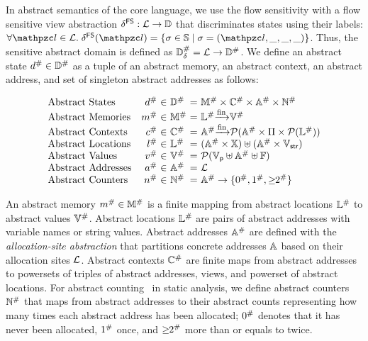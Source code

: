 In abstract semantics of the core language, we use the flow sensitivity with a
flow sensitive view abstraction $\delta^{\textsf{FS}}: \mathcal{L} \rightarrow \mathbb{D}$ that
discriminates states using their labels: $\forall \lab \in \labset. \;
\fsviewmap(\lab) = \{ \st \in \stset \mid \st = (\lab, \_, \_, \_) \}$. Thus, the
sensitive abstract domain is defined as ${\mathbb{D}}^{\#}_\delta = \mathcal{L} \rightarrow
{\mathbb{D}}^{\#}$.  We define an abstract state ${d}^{\#} \in {\mathbb{D}}^{\#}$ as a tuple of an
abstract memory, an abstract context, an abstract address, and set of singleton
abstract addresses as follows:

\[
  \begin{array}{lr@{~}c@{~}l@{~}c@{~}l}
    \text{Abstract States} & \abselem &\in& \absdom &=& \absmemset \times \absctxtset
    \times \absaddrset \times \abscountset\\
    \text{Abstract Memories} & \absmem &\in& \absmemset &=& \abslocset \finmap
    \absvalset\\
    \text{Abstract Contexts} & \absctxt &\in& \absctxtset &=& \absaddrset \finmap
    \powerset{\absaddrset \times \viewset \times \powerset{\abslocset}}\\
    \text{Abstract Locations} & \absloc &\in& \abslocset &=& (\absaddrset \times
    \varset) \uplus (\absaddrset \times \strset)\\
    \text{Abstract Values} & \absval &\in& \absvalset &=& \powerset{\pvalset
    \uplus \absaddrset \uplus \fvalset}\\
    \text{Abstract Addresses} & \absaddr &\in& \absaddrset &=& \labset\\
    \text{Abstract Counters} & \abscount &\in& \abscountset &=& \absaddrset
    \rightarrow \{ \abszero, \absone, \absmany \}\\
  \end{array}
\]

An abstract memory ${m}^{\#} \in {\mathbb{M}}^{\#}$ is a finite mapping from abstract
locations ${\mathbb{L}}^{\#}$ to abstract values ${\mathbb{V}}^{\#}$.  Abstract locations
${\mathbb{L}}^{\#}$ are pairs of abstract addresses with variable names or string
values. Abstract addresses ${\mathbb{A}}^{\#}$ are defined with the
\textit{allocation-site abstraction} that partitions concrete addresses
$\mathbb{A}$ based on their allocation sites $\mathcal{L}$.  Abstract contexts
${\mathbb{C}}^{\#}$ are finite maps from abstract addresses to powersets of triples of
abstract addresses, views, and powerset of abstract locations.  For abstract
counting~\cite{abstract-gc-counting, revisit-recency} in static analysis, we
define abstract counters ${\mathbb{N}}^{\#}$ that maps from abstract addresses to
their abstract counts representing how many times each abstract address has been
allocated; ${0}^{\#}$ denotes that it has never been allocated, ${1}^{\#}$ once,
and ${\geq\!\!2}^{\#}$ more than or equals to twice.

